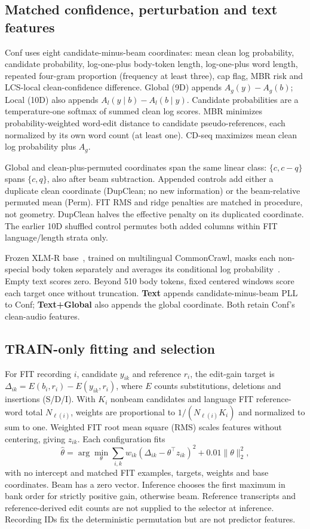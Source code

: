 \documentclass{article}
\begin{document}
\subsection{Matched confidence, perturbation and text features}
Conf uses eight candidate-minus-beam coordinates: mean clean log probability, candidate probability, log-one-plus body-token length, log-one-plus word length, repeated four-gram proportion (frequency at least three), cap flag, MBR risk and LCS-local clean-confidence difference. Global (9D) appends $A_g(y)-A_g(b)$; Local (10D) also appends $A_l(y\mid b)-A_l(b\mid y)$. Candidate probabilities are a temperature-one softmax of summed clean log scores. MBR minimizes probability-weighted word-edit distance to candidate pseudo-references, each normalized by its own word count (at least one). CD-seq maximizes mean clean log probability plus $A_g$.

Global and clean-plus-permuted coordinates span the same linear class: $\{c,c-q\}$ spans $\{c,q\}$, also after beam subtraction. Appended controls add either a duplicate clean coordinate (DupClean; no new information) or the beam-relative permuted mean (Perm). FIT RMS and ridge penalties are matched in procedure, not geometry. DupClean halves the effective penalty on its duplicated coordinate. The earlier 10D shuffled control permutes both added columns within FIT language/length strata only.

Frozen XLM-R base~\cite{xlmr}, trained on multilingual CommonCrawl, masks each non-special body token separately and averages its conditional log probability~\cite{mlmscoring}. Empty text scores zero. Beyond 510 body tokens, fixed centered windows score each target once without truncation. \textbf{Text} appends candidate-minus-beam PLL to Conf; \textbf{Text+Global} also appends the global coordinate. Both retain Conf's clean-audio features.

\subsection{TRAIN-only fitting and selection}
For FIT recording $i$, candidate $y_{ik}$ and reference $r_i$, the edit-gain target is $\Delta_{ik}=E(b_i,r_i)-E(y_{ik},r_i)$, where $E$ counts substitutions, deletions and insertions (S/D/I). With $K_i$ nonbeam candidates and language FIT reference-word total $N_{\ell(i)}$, weights are proportional to $1/(N_{\ell(i)}K_i)$ and normalized to sum to one. Weighted FIT root mean square (RMS) scales features without centering, giving $z_{ik}$. Each configuration fits
\begin{equation}
 \widehat\theta=\arg\min_\theta\sum_{i,k}w_{ik}(\Delta_{ik}-\theta^\top z_{ik})^2+0.01\|\theta\|_2^2,
\end{equation}
with no intercept and matched FIT examples, targets, weights and base coordinates. Beam has a zero vector. Inference chooses the first maximum in bank order for strictly positive gain, otherwise beam. Reference transcripts and reference-derived edit counts are not supplied to the selector at inference. Recording IDs fix the deterministic permutation but are not predictor features.
\end{document}
